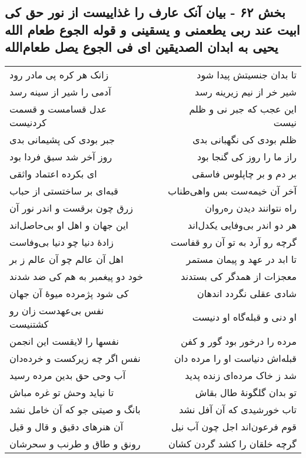 \begin{center}
\section*{بخش ۶۲ - بیان آنک عارف را غذاییست از نور حق کی ابیت عند ربی یطعمنی و یسقینی و قوله الجوع طعام الله یحیی به ابدان الصدیقین ای فی الجوع یصل طعام‌الله}
\label{sec:sh062}
\begin{longtable}{l p{0.5cm} r}
زانک هر کره پی مادر رود
&&
تا بدان جنسیتش پیدا شود
\\
آدمی را شیر از سینه رسد
&&
شیر خر از نیم زیرینه رسد
\\
عدل قسامست و قسمت کردنیست
&&
این عجب که جبر نی و ظلم نیست
\\
جبر بودی کی پشیمانی بدی
&&
ظلم بودی کی نگهبانی بدی
\\
روز آخر شد سبق فردا بود
&&
راز ما را روز کی گنجا بود
\\
ای بکرده اعتماد واثقی
&&
بر دم و بر چاپلوس فاسقی
\\
قبه‌ای بر ساختستی از حباب
&&
آخر آن خیمه‌ست بس واهی‌طناب
\\
زرق چون برقست و اندر نور آن
&&
راه نتوانند دیدن ره‌روان
\\
این جهان و اهل او بی‌حاصل‌اند
&&
هر دو اندر بی‌وفایی یکدل‌اند
\\
زادهٔ دنیا چو دنیا بی‌وفاست
&&
گرچه رو آرد به تو آن رو قفاست
\\
اهل آن عالم چو آن عالم ز بر
&&
تا ابد در عهد و پیمان مستمر
\\
خود دو پیغمبر به هم کی ضد شدند
&&
معجزات از همدگر کی بستدند
\\
کی شود پژمرده میوهٔ آن جهان
&&
شادی عقلی نگردد اندهان
\\
نفس بی‌عهدست زان رو کشتنیست
&&
او دنی و قبله‌گاه او دنیست
\\
نفسها را لایقست این انجمن
&&
مرده را درخور بود گور و کفن
\\
نفس اگر چه زیرکست و خرده‌دان
&&
قبله‌اش دنیاست او را مرده دان
\\
آب وحی حق بدین مرده رسید
&&
شد ز خاک مرده‌ای زنده پدید
\\
تا نیاید وحش تو غره مباش
&&
تو بدان گلگونهٔ طال بقاش
\\
بانگ و صیتی جو که آن خامل نشد
&&
تاب خورشیدی که آن آفل نشد
\\
آن هنرهای دقیق و قال و قیل
&&
قوم فرعون‌اند اجل چون آب نیل
\\
رونق و طاق و طرنب و سحرشان
&&
گرچه خلقان را کشد گردن کشان
\\

\end{longtable}
\end{center}
